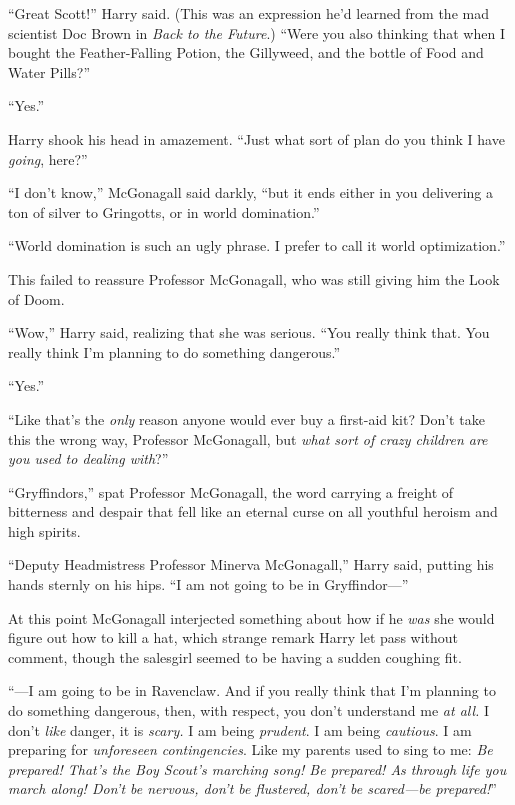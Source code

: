 “Great Scott!” Harry said. (This was an expression he’d learned from the mad scientist Doc Brown in \emph{Back to the Future}.) “Were you also thinking that when I bought the Feather-Falling Potion, the Gillyweed, and the bottle of Food and Water Pills?”

“Yes.”

Harry shook his head in amazement. “Just what sort of plan do you think I have \emph{going}, here?”

“I don’t know,” McGonagall said darkly, “but it ends either in you delivering a ton of silver to Gringotts, or in world domination.”

“World domination is such an ugly phrase. I prefer to call it world optimization.”

This failed to reassure Professor McGonagall, who was still giving him the Look of Doom.

“Wow,” Harry said, realizing that she was serious. “You really think that. You really think I’m planning to do something dangerous.”

“Yes.”

“Like that’s the \emph{only} reason anyone would ever buy a first-aid kit? Don’t take this the wrong way, Professor McGonagall, but \emph{what sort of crazy children are you used to dealing with}?”

“Gryffindors,” spat Professor McGonagall, the word carrying a freight of bitterness and despair that fell like an eternal curse on all youthful heroism and high spirits.

“Deputy Headmistress Professor Minerva McGonagall,” Harry said, putting his hands sternly on his hips. “I am not going to be in Gryffindor—”

At this point McGonagall interjected something about how if he \emph{was} she would figure out how to kill a hat, which strange remark Harry let pass without comment, though the salesgirl seemed to be having a sudden coughing fit.

“—I am going to be in Ravenclaw. And if you really think that I’m planning to do something dangerous, then, with respect, you don’t understand me \emph{at all.} I don’t \emph{like} danger, it is \emph{scary.} I am being \emph{prudent}. I am being \emph{cautious}. I am preparing for \emph{unforeseen contingencies}. Like my parents used to sing to me: \emph{Be prepared! That’s the Boy Scout’s marching song! Be prepared! As through life you march along! Don’t be nervous, don’t be flustered, don’t be scared—be prepared!}”

